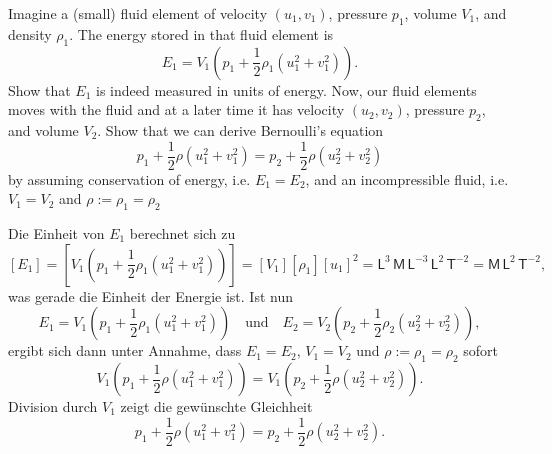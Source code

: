 \documentclass[12pt]{exam}
\begin{document}
\begin{questions}
    
    \question Imagine a (small) fluid element of velocity $(u_1, v_1)$, pressure $p_1$, volume $V_1$, and density $\rho_1$. The energy stored in that fluid element is
    \begin{equation*}
        E_1 = V_1 \left( p_1 + \frac{1}{2} \rho_1 (u^2_1 + v^2_1) \right).
    \end{equation*}
    Show that $E_1$ is indeed measured in units of energy. \newline
    Now, our fluid elements moves with the fluid and at a later time it has velocity $(u_2, v_2)$, pressure $p_2$, and volume $V_2$. Show that we can derive Bernoulli's equation
    \begin{equation*}
        p_1 + \frac{1}{2} \rho (u^2_1 + v^2_1) = p_2 + \frac{1}{2} \rho (u^2_2 + v^2_2)
    \end{equation*}
    by assuming conservation of energy, i.e. $E_1 = E_2$, and an incompressible fluid, i.e. $V_1 = V_2$ and $\rho := \rho_1 = \rho_2$
    
    \begin{solution}
        Die Einheit von $E_1$ berechnet sich zu
        \begin{equation*}
            \left[ E_1 \right] = \left[ V_1 \left( p_1 + \frac{1}{2} \rho_1 (u^2_1 + v^2_1) \right) \right] = \left[ V_1 \right] \left[ \rho_1 \right] \left[ u_1 \right]^2 = \mathsf{L}^3 \, \mathsf{M} \, \mathsf{L}^{-3} \, \mathsf{L}^2 \, \mathsf{T}^{-2} = \mathsf{M} \, \mathsf{L}^2 \, \mathsf{T}^{-2},
        \end{equation*}
        was gerade die Einheit der Energie ist. Ist nun
        \begin{equation*}
            E_1 = V_1 \left( p_1 + \frac{1}{2} \rho_1 (u^2_1 + v^2_1) \right)
            \quad \text{und} \quad
            E_2 = V_2 \left( p_2 + \frac{1}{2} \rho_2 (u^2_2 + v^2_2) \right),
        \end{equation*}
        ergibt sich dann unter Annahme, dass $E_1 = E_2$, $V_1 = V_2$ und $\rho := \rho_1 = \rho_2$ sofort
        \begin{equation*}
            V_1 \left( p_1 + \frac{1}{2} \rho (u^2_1 + v^2_1) \right) = V_1 \left( p_2 + \frac{1}{2} \rho (u^2_2 + v^2_2) \right).
        \end{equation*}
        Division durch $V_1$ zeigt die gewünschte Gleichheit
        \begin{equation*}
            p_1 + \frac{1}{2} \rho (u^2_1 + v^2_1) = p_2 + \frac{1}{2} \rho (u^2_2 + v^2_2).
        \end{equation*}
    \end{solution}
    

\end{questions}
\end{document}
